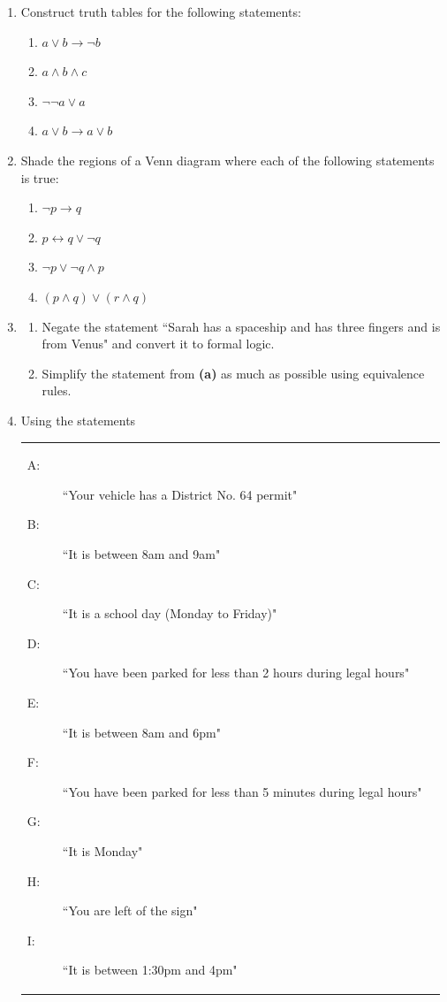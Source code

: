 \documentclass{article}
\begin{document}
\begin{enumerate}
\item Construct\marginpar{[8]} truth tables for the following statements:
	\renewcommand{\labelenumii}{(\alph{enumii})}\begin{enumerate}
	\item $a\vee b\to\neg b$
	\item $a\wedge b\wedge c$
	\item $\neg\neg a\vee a$
	\item $a\vee b\to a\vee b$
	\end{enumerate}
\item Shade\marginpar{[8]} the regions of a Venn diagram where each of the following statements is true:
	\begin{enumerate}
	\item $\neg p\to q$
	\item $p\leftrightarrow q\vee\neg q$
	\item $\neg p\vee \neg q\wedge p$
	\item $(p\wedge q)\vee(r\wedge q)$
	\end{enumerate}
\item \begin{enumerate}
	\item Negate\marginpar{[4]} the statement ``Sarah has a spaceship and has three fingers and is from Venus" and convert it to formal logic.
	\item Simplify the statement from \textbf{(a)} as much as possible using equivalence rules.
	\end{enumerate}
\item Using\marginpar{[3]} the statements\\
	\begin{tabular}{p{}p{}}
	\begin{description}
	\item[A:] ``Your vehicle has a District No. 64 permit"
	\item[B:] ``It is between 8am and 9am"
	\item[C:] ``It is a school day (Monday to Friday)"
	\item[D:] ``You have been parked for less than 2 hours during legal hours"
	\item[E:] ``It is between 8am and 6pm"
	\item[F:] ``You have been parked for less than 5 minutes during legal hours"
	\item[G:] ``It is Monday"
	\item[H:] ``You are left of the sign"
	\item[I:] ``It is between 1:30pm and 4pm"

\end{description}
\end{tabular}
\end{enumerate}
\end{document}
